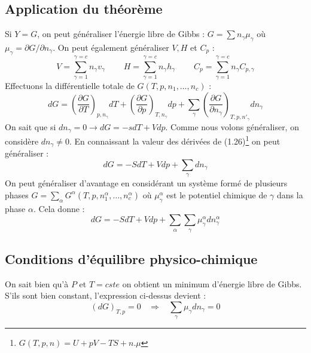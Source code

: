 \documentclass[11pt, a4paper, openany]{book}
\begin{document}
		\subsection{Application du théorème}
		Si $Y = G$, on peut généraliser l'énergie libre de Gibbs : $G = \sum n_\gamma \mu_\gamma$ où $\mu_\gamma = \partial G / \partial n_\gamma$. On peut également généraliser $V, H$ et $C_p$ :
		\begin{equation}
			V = \sum_{\gamma = 1}^{\gamma = c} n_\gamma v_\gamma\ \ \ \ \ \ \ \ \ \ 
			H = \sum_{\gamma = 1}^{\gamma = c} n_\gamma h_\gamma\ \ \ \ \ \ \ \ \ \ 
			C_p = \sum_{\gamma = 1}^{\gamma = c} n_\gamma C_{p,\gamma}
		\end{equation}
		Effectuons la différentielle totale de $G(T, p, n_1,\dots, n_c)$ :
		\begin{equation}
			dG = \left( \frac{\partial G}{\partial T} \right)_{p,n_\gamma} dT + \left( \frac{\partial G}{\partial p} \right)_{T,n_\gamma} dp + \sum_\gamma \left( \frac{\partial G}{\partial n_\gamma} \right)_{T, p, n'_\gamma} dn_\gamma
		\end{equation}
		On sait que si $dn_\gamma = 0 \rightarrow dG = -sdT + Vdp$. Comme nous volons généraliser, on considère $dn_\gamma \neq 0$. En connaissant la valeur des dérivées de (1.26)\footnote{$G(T,p,n) = U + pV - TS + n.\mu$} on peut généraliser :
		\begin{equation}
			dG = -S dT + V dp + \sum_\gamma dn_\gamma
		\end{equation}
		On peut généraliser d'avantage en considérant un système formé de plusieurs phases $G = \sum_\alpha G^\alpha(T, p, n_1^\alpha, \dots, n_c^\alpha)$ où $\mu_\gamma^\alpha$ est le potentiel chimique de $\gamma$ dans la phase $\alpha$. Cela donne :
		\begin{equation}
			dG = -SdT + Vdp + \sum_\alpha \sum_\gamma \mu_\gamma^\alpha dn_\gamma^\alpha
		\end{equation}
		
		\subsection{Conditions d'équilibre physico-chimique}
		On sait bien qu'à $P$ et $T = cste$ on obtient un minimum d'énergie libre de Gibbs. S'ils sont bien constant, l'expression ci-dessus devient :
		\begin{equation}
			(dG)_{T, p} = 0 \ \ \ \ \Rightarrow\ \ \ \ \sum_\gamma \mu_\gamma dn_\gamma = 0
		\end{equation}
		
\end{document}
